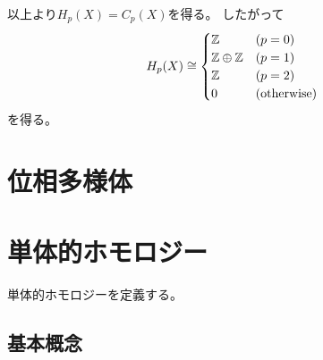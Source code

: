 \documentclass[report]{jlreq}
\begin{document}
\begin{example}[2次元トーラス]
    以上より$H_p(X) = C_p(X)$を得る。
    したがって
    \begin{equation}
        H_p(X) \cong \begin{cases}
            \mathbb{Z} & (p = 0) \\
            \mathbb{Z} \oplus \mathbb{Z} & (p = 1) \\
            \mathbb{Z} & (p = 2) \\
            0 & (\text{otherwise})
        \end{cases}
    \end{equation}
    を得る。
\end{example}

\begin{example}[実射影空間]
    \TODO{}
\end{example}

%
\section{位相多様体}

\begin{definition}[局所ホモロジー]
    \TODO{}
\end{definition}

\begin{definition}[向きづけ]
    \TODO{}
\end{definition}

\begin{definition}[基本類]
    \TODO{}
\end{definition}

\begin{theorem}
    \TODO{}
\end{theorem}

%
\section{単体的ホモロジー}


単体的ホモロジーを定義する。

\subsection{基本概念}
\end{document}
